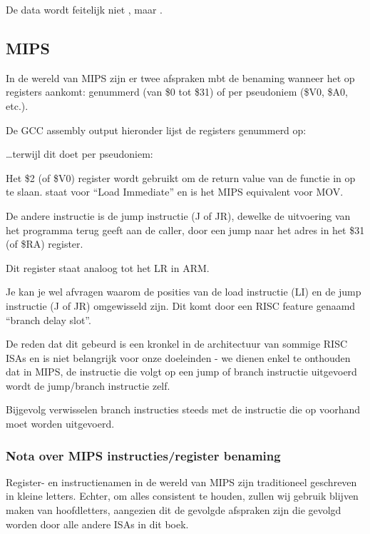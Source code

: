 De data wordt feitelijk niet , maar .

\subsection{MIPS}

\label{MIPS_leaf_function_ex1}
In de wereld van MIPS zijn er twee afspraken mbt de benaming wanneer het op registers aankomt:
genummerd (van \$0 tot \$31) of per pseudoniem (\$V0, \$A0, etc.).

De GCC assembly output hieronder lijst de registers genummerd op:



\dots terwijl \IDA dit doet per pseudoniem:



Het \$2 (of \$V0) register wordt gebruikt om de return value van de functie in op te slaan.
 staat voor ``Load Immediate'' en is het MIPS equivalent voor MOV.

De andere instructie is de jump instructie (J of JR), dewelke de uitvoering van het programma terug geeft aan de \gls{caller}, door een jump naar het adres in het \$31 (of \$RA) register.

Dit register staat analoog tot het \ac{LR} in ARM.

Je kan je wel afvragen waarom de posities van de load instructie (LI) en de jump instructie (J of JR) omgewisseld zijn. Dit komt door een \ac{RISC} feature genaamd ``branch delay slot''.

De reden dat dit gebeurd is een kronkel in de architectuur van sommige RISC \ac{ISA}s en is niet belangrijk voor onze doeleinden - we dienen enkel te onthouden dat in MIPS, de instructie die volgt op een jump of branch instructie uitgevoerd wordt  de jump/branch instructie zelf.

Bijgevolg verwisselen branch instructies steeds met de instructie die op voorhand moet worden uitgevoerd.

\subsubsection{Nota over MIPS instructies/register benaming}

Register- en instructienamen in de wereld van MIPS zijn traditioneel geschreven in kleine letters.
Echter, om alles consistent te houden, zullen wij gebruik blijven maken van hoofdletters, aangezien dit de gevolgde afspraken zijn die gevolgd worden door alle andere \ac{ISA}s in dit boek.


